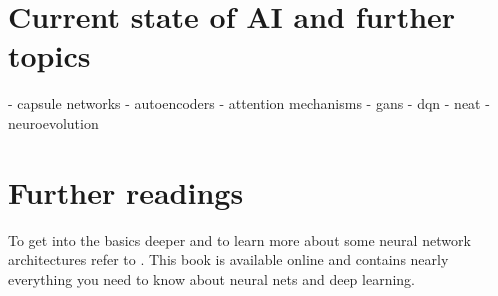 \documentclass[jou,apacite]{apa6}
\begin{document}
\section{Current state of AI and further topics}
 - capsule networks
 - autoencoders
 - attention mechanisms
 - gans
 - dqn
 - neat
 - neuroevolution

\section{Further readings}
To get into the basics deeper and to learn more about some neural network architectures refer to \cite{Goodfellow-et-al-2016}. This book is available online and contains nearly everything you need to know about neural nets and deep learning.

\printglossaries
\printindex

\end{document}
